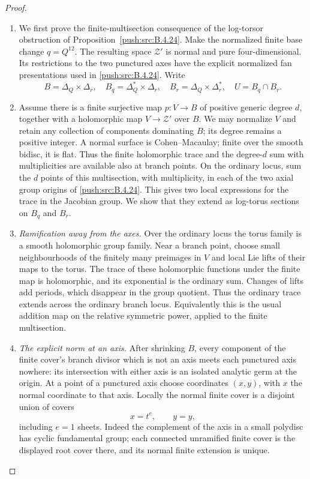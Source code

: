\begin{proof}
\begin{enumerate}[label=\arabic*.,leftmargin=*]
\item We first prove the finite-multisection consequence of
the log-torsor obstruction of Proposition~\ref{push:src:B.4.24}.
Make the normalized finite base change $q=Q^{12}$.
The resulting space $\mathcal Z'$ is normal and
pure four-dimensional. Its restrictions to the two
punctured axes have the explicit normalized fan
presentations used in \ref{push:src:B.4.24}. Write
\[
 B=\Delta_Q\times\Delta_r,\quad
 B_q=\Delta_Q^*\times\Delta_r,\quad
 B_r=\Delta_Q\times\Delta_r^*,\quad
 U=B_q\cap B_r.
\]

\item Assume there is a finite surjective map
$p:V\to B$ of positive generic degree $d$, together
with a holomorphic map $V\to\mathcal Z'$ over $B$.
We may normalize $V$ and retain any collection of
components dominating $B$; its degree remains a
positive integer. A normal surface is Cohen--Macaulay;
finite over the smooth bidisc, it is flat. Thus the
finite holomorphic trace and the degree-$d$ sum with
multiplicities are available also at branch points.
On the ordinary locus, sum the
$d$ points of this multisection, with multiplicity,
in each of the two axial group origins of
\ref{push:src:B.4.24}. This gives two local expressions for the
trace in the Jacobian group. We show that they
extend as log-torus sections on $B_q$ and $B_r$.

\item \emph{Ramification away from the axes.}
Over the ordinary locus the torus family is a smooth
holomorphic group family. Near a branch point, choose
small neighbourhoods of the finitely many preimages
in $V$ and local Lie lifts of their maps to the torus.
The trace of these holomorphic functions under the
finite map is holomorphic, and its exponential is
the ordinary sum. Changes of lifts add periods,
which disappear in the group quotient. Thus the
ordinary trace extends across the ordinary branch
locus. Equivalently this is the usual addition map
on the relative symmetric power, applied to the
finite multisection.

\item \emph{The explicit norm at an axis.}
After shrinking $B$, every component of the finite
cover's branch divisor which is not an axis meets
each punctured axis nowhere: its intersection with
either axis is an isolated analytic germ at the
origin. At a point of a punctured axis choose
coordinates $(x,y)$, with $x$ the normal coordinate
to that axis. Locally the normal finite cover is
a disjoint union of covers
\begin{equation}
 x=t^e,\qquad y=y,
\label{pub:I:eq:B-4-26-1}
\end{equation}
including $e=1$ sheets. Indeed the complement of
the axis in a small polydisc has cyclic fundamental
group; each connected unramified finite cover is
the displayed root cover there, and its normal
finite extension is unique.


\end{enumerate}
\end{proof}
